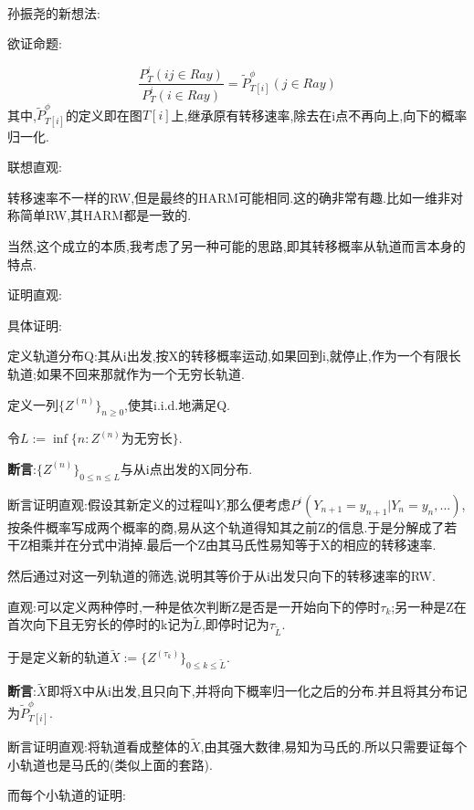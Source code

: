 \documentclass[a4paper,oneside]{ctexbook}
\begin{document}
		 \begin{pf}[temp孙振尧证明]
		 	\label{sun}
		 	\ 

		 	孙振尧的新想法:

		 	欲证命题:

		 		$$\displaystyle\frac
		 		{P^i_T(ij \in Ray)}
		 		{P^i_T(i \in Ray)}
		 		=
		 		\tilde{P}^{\phi}_{T[i]}(j \in Ray)
		 		$$
		 		其中,$\tilde{P}^{\phi}_{T[i]}$的定义即在图$T[i]$上,继承原有转移速率,除去在i点不再向上,向下的概率归一化.
			
			联想直观:
				
				转移速率不一样的RW,但是最终的HARM可能相同.这的确非常有趣.比如一维非对称简单RW,其HARM都是一致的.

				当然,这个成立的本质,我考虑了另一种可能的思路,即其转移概率从轨道而言本身的特点.
			
			证明直观:



			具体证明:
			
				定义轨道分布Q:其从i出发,按X的转移概率运动,如果回到i,就停止,作为一个有限长轨道;如果不回来那就作为一个无穷长轨道.

				定义一列$\{Z^{(n)}\}_{n \ge 0}$,使其i.i.d.地满足Q.

				令$L := \inf\{n: Z^{(n)}\mbox{为无穷长}\}$.

				\qquad \textbf{断言}:$\{Z^{(n)}\}_{0 \le n \le L}$与从i点出发的X同分布.
				
					断言证明直观:假设其新定义的过程叫$Y$,那么便考虑$P^i(Y_{n+1}=y_{n+1}|Y_n=y_n,...)$,按条件概率写成两个概率的商,易从这个轨道得知其之前Z的信息.于是分解成了若干Z相乘并在分式中消掉.最后一个Z由其马氏性易知等于X的相应的转移速率.
					

				
				然后通过对这一列轨道的筛选,说明其等价于从i出发只向下的转移速率的RW.
				
					直观:可以定义两种停时,一种是依次判断Z是否是一开始向下的停时$\tau_k$;另一种是Z在首次向下且无穷长的停时的k记为$\tilde{L}$,即停时记为$\tau_{\tilde{L}}$.

					于是定义新的轨道$\tilde{X} := \{Z^{(\tau_k)}\}_{0 \le k \le \tilde{L}}$.

				\qquad \textbf{断言}:$\tilde{X}$即将X中从i出发,且只向下,并将向下概率归一化之后的分布.并且将其分布记为$\tilde{P}^{\phi}_{T[i]}$.

					断言证明直观:将轨道看成整体的$\tilde{X}$,由其强大数律,易知为马氏的.所以只需要证每个小轨道也是马氏的(类似上面的套路).

					而每个小轨道的证明:


\end{pf}
\end{document}
